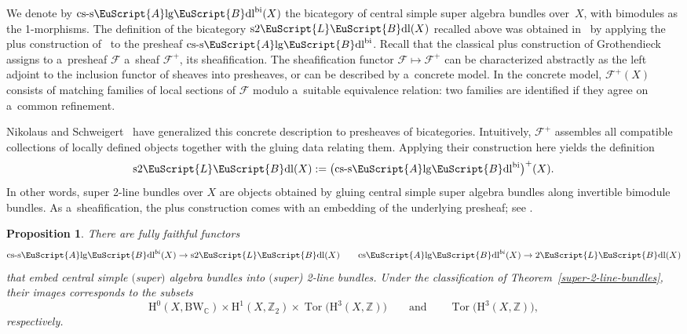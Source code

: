 \documentclass[10pt,a4paper]{amsart}
\numberwithin{equation}{section}
\newtheorem{Proposition}[Theorem]{Proposition}
 { \theoremstyle{definition}
\newtheorem{Definition}[Theorem]{Definition}
\newtheorem{Example}[Theorem]{Example}
\newtheorem{Remark}[Theorem]{Remark} }
\def\mathscr#1{\EuScript{#1}}
\def\Z {\mathbb{Z}}
\def\C {\mathbb{C}}
\def\h {\mathrm{H}}
\newcommand{\LineBdl}{\mathscr{L}\mathscr{B}\mathrm{dl}}
\newcommand{\twoLineBdl}{2\LineBdl}
\newcommand{\stwoLineBdl}{\mathrm{s}2\LineBdl}
\newcommand{\Alg}{\Incl\mathrm{lg}}
\newcommand{\csAlg}{\mathrm{cs}\Incl\mathrm{lg}}
\newcommand{\cssAlg}{\mathrm{cs\text{-}s}\Alg}
\newcommand{\csAlgBdl}{\csAlg\mathscr{B}\mathrm{dl}}
\newcommand{\cssAlgBdl}{\cssAlg\mathscr{B}\mathrm{dl}}
\newcommand{\cssAlgBdlbi}{\cssAlg\mathscr{B}\mathrm{dl}^{\mathrm{bi}}}
\newcommand{\Incl}{\mathscr{A}}
\def\quand{\qquad\text{and}\qquad}
\begin{document}
We denote by $\cssAlgBdlbi(X)$ the bicategory of central simple super algebra bundles over~$X$, with bimodules as the 1-morphisms.
The definition of the bicategory $\stwoLineBdl(X)$ recalled above was obtained in~\cite{Kristel2020} by applying the plus construction of~\cite{nikolaus2} to the presheaf $\cssAlgBdlbi$. Recall that the classical plus construction of Grothendieck assigns to a~presheaf $\mathcal{F}$ a~sheaf $\mathcal{F}^+$, its sheafification. The sheafification functor $\mathcal{F} \mapsto \mathcal{F}^+$ can be characterized abstractly as the left adjoint to the inclusion functor of sheaves into presheaves, or can be described by a~concrete model. In the concrete model, $\mathcal{F}^+(X)$ consists of matching families of local sections of $\mathcal{F}$ modulo a~suitable equivalence relation: two families are identified if they agree on a~common refinement.

Nikolaus and Schweigert~\cite{nikolaus2} have generalized this concrete description to presheaves of bicategories. Intuitively, $\mathcal{F}^+$ assembles all compatible collections of locally defined objects together with the gluing data relating them.
Applying their construction here yields the definition
\begin{equation*}
 \stwoLineBdl(X) := \bigl(\cssAlgBdlbi\bigr)^{+}(X).
\end{equation*}
In other words, super 2-line bundles over $X$ are objects obtained by gluing central simple super algebra bundles along invertible bimodule bundles.
As a~sheafification, the plus construction comes with an embedding of the underlying presheaf; see \cite[Section~3.3]{Kristel2020}.

\begin{Proposition}
\label{embedding-of-algebra-bundles}
There are fully faithful functors
\begin{equation*}
\cssAlgBdl^{bi}(X)\to \stwoLineBdl(X)
\qquad
\csAlgBdl^{bi}(X) \to \twoLineBdl(X)
\end{equation*}
that embed central simple $($super$)$ algebra bundles into $($super{\rm) 2}-line bundles. Under the classification of Theorem~{\rm\ref{super-2-line-bundles}}, their images corresponds to the subsets
\begin{equation*}
\h^0(X,\mathrm{BW}_{\C})\times \h^1(X,\Z_2) \times \operatorname{Tor}\bigl(\h^3(X,\Z)\bigr) \quand \operatorname{Tor}\bigl(\h^3(X,\Z)\bigr),
\end{equation*}
respectively.
\end{Proposition}
\end{document}

